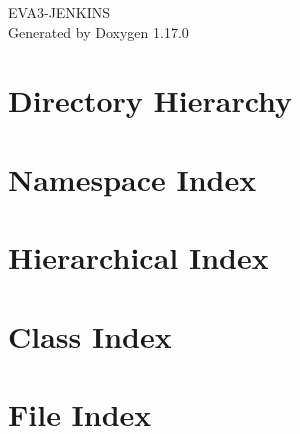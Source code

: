 \documentclass[twoside]{book}
\newcommand{\+}{\discretionary{\mbox{\scriptsize$\hookleftarrow$}}{}{}}
\newcommand{\clearemptydoublepage}{%
    \newpage{\pagestyle{empty}\cleardoublepage}%
  }
\begin{document}
  \raggedbottom
    \hypersetup{pageanchor=false,
                bookmarksnumbered=true,
                pdfencoding=unicode
               }
  \begin{titlepage}
  \vspace*{7cm}
  \begin{center}%
  {\Large EVA3-\/\+JENKINS}\\
  \vspace*{1cm}
  {\large Generated by Doxygen 1.17.0}\\
  \end{center}
  \end{titlepage}
  \clearemptydoublepage
  \tableofcontents
  \clearemptydoublepage
  \hypersetup{pageanchor=true}

\chapter{Directory Hierarchy}

\chapter{Namespace Index}

\chapter{Hierarchical Index}

\chapter{Class Index}

\chapter{File Index}

\end{document}

